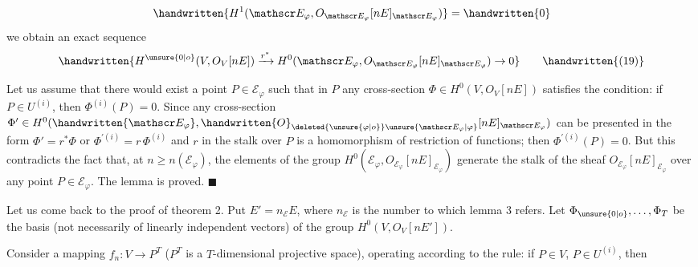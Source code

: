 \[
\handwritten{H^1(\mathscr E_{\varphi},O_{\mathscr E_{\varphi}}[nE]_{\mathscr E_{\varphi}})}=\handwritten{0}
\]
we obtain an exact sequence
\[
\handwritten{H^{\unsure{0|o}}(V,O_V[nE])\xrightarrow{r^*}H^0(\mathscr E_{\varphi},O_{\mathscr E_{\varphi}}[nE]_{\mathscr E_{\varphi}})\to0}\tag*{\handwritten{(19)}}
\]

Let us assume that there would exist a point $P\in\mathscr E_{\varphi}$
such that in $P$ any cross-section $\Phi\in H^0(V,O_V[nE])$
satisfies the condition: if $P\in U^{(i)}$, then $\Phi^{(i)}(P)=0$.
Since any cross-section $\Phi'\in H^0(\handwritten{\mathscr E_{\varphi}},\handwritten{O}_{\deleted{\unsure{\varphi|o}}\unsure{\mathscr E_{\varphi}|\varphi}}[nE]_{\mathscr E_{\varphi}})$ can be
presented in the form $\Phi'=r^*\Phi$ or $\Phi^{\prime(i)}=r\,\Phi^{(i)}$ and
$r$ in the stalk over $P$ is a homomorphism of restriction
of functions; then $\Phi^{\prime(i)}(P)=0$. But this contradicts
the fact that, at $n\ge n(\mathscr E_{\varphi})$, the elements of the group
$H^0(\mathscr E_{\varphi},O_{\mathscr E_{\varphi}}[nE]_{\mathscr E_{\varphi}})$ generate the stalk of the sheaf
$O_{\mathscr E_{\varphi}}[nE]_{\mathscr E_{\varphi}}$ over any point $P\in\mathscr E_{\varphi}$. The lemma is proved. $\blacksquare$

Let us come back to the proof of theorem 2. Put
$E'=n_{\mathscr E}E$, where $n_{\mathscr E}$ is the number to which lemma 3
refers. Let $\Phi_{\unsure{0|o}},\ldots,\Phi_T$ be the basis (not necessarily
of linearly independent vectors) of the group
$H^0(V,O_V[nE'])$.

Consider a mapping $f_n\colon V\to P^T$ ($P^T$ is a
$T$-dimensional projective space), operating according to
the rule: if $P\in V$, $P\in U^{(i)}$, then
